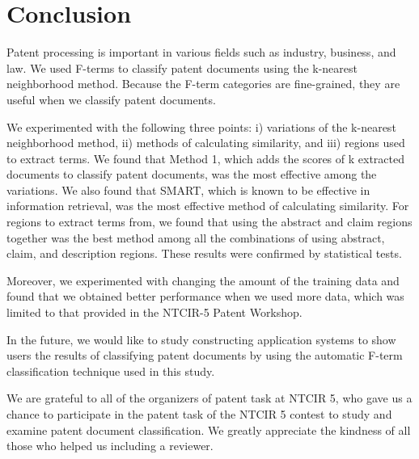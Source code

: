 \documentclass[english]{jnlp_1.2c}
\begin{document}
\section{Conclusion}
\label{sec:conclusion}

Patent processing is important in 
various fields such as industry, business, and law.
We used F-terms to classify 
patent documents using the k-nearest neighborhood method.
Because the F-term categories are fine-grained, 
they are useful when we classify patent documents. 

We experimented with the following three points:
i) variations of 
the k-nearest neighborhood method, 
ii) methods of calculating 
similarity, and 
iii) regions used to extract terms. 
We found that 
Method 1, which adds the scores of 
k extracted documents to classify patent documents, was the most effective
among the variations. 
We also found that 
SMART, which is known 
to be effective in information retrieval, 
was the most effective method of calculating similarity.    
For regions to extract terms from, 
we found that 
using the abstract and claim regions together
was the best method among 
all the combinations of using
abstract, claim, and description regions.
These results were confirmed by statistical tests.

Moreover, we experimented with changing 
the amount of the training data 
and found that 
we obtained better performance 
when we used more data,
which was limited to that provided in the NTCIR-5 Patent Workshop. 

In the future, 
we would like to study 
constructing application systems 
to show users the results of classifying patent documents
by using the automatic F-term classification technique
used in this study. 


\acknowledgment

We are grateful to all of the organizers of patent task at NTCIR 5, 
who gave us a chance to participate in the patent task of the NTCIR 5 contest 
to study and examine patent document classification. 
We greatly appreciate the kindness of all those who helped us including a reviewer. 
\end{document}
